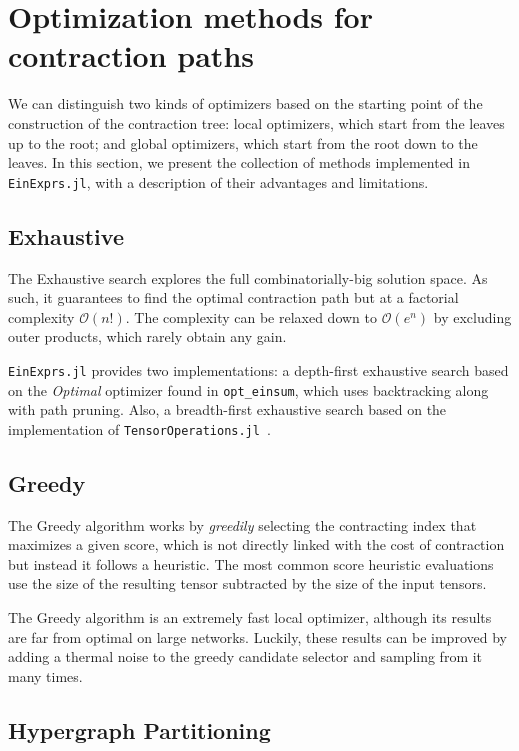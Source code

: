 \documentclass{juliacon}
\begin{document}
\section{Optimization methods for contraction paths}\label{sec:optimization-methods}

We can distinguish two kinds of optimizers based on the starting point of the construction of the contraction tree: local optimizers, which start from the leaves up to the root; and global optimizers, which start from the root down to the leaves. In this section, we present the collection of methods implemented in \texttt{EinExprs.jl}, with a description of their advantages and limitations.

\subsection{Exhaustive}
The Exhaustive search explores the full combinatorially-big solution space.
As such, it guarantees to find the optimal contraction path but at a factorial complexity $\mathcal{O}(n!)$. The complexity can be relaxed down to $\mathcal{O}(e^n)$ by excluding outer products, which rarely obtain any gain.

\texttt{EinExprs.jl} provides two implementations: a depth-first exhaustive search based on the \textit{Optimal} optimizer found in \texttt{opt\_einsum}, which uses backtracking along with path pruning. Also, a breadth-first exhaustive search based on the implementation of \texttt{TensorOperations.jl}~\cite{pfeifer2014faster}.

\subsection{Greedy}
The Greedy algorithm works by \textit{greedily} selecting the contracting index that maximizes a given score, which is not directly linked with the cost of contraction but instead it follows a heuristic. The most common score heuristic evaluations use the size of the resulting tensor subtracted by the size of the input tensors.

The Greedy algorithm is an extremely fast local optimizer, although its results are far from optimal on large networks. Luckily, these results can be improved by adding a thermal noise to the greedy candidate selector and sampling from it many times.

\subsection{Hypergraph Partitioning}
\end{document}
